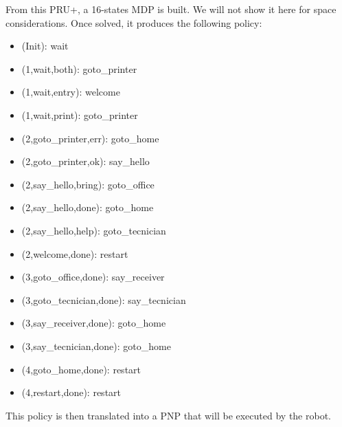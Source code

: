 From this PRU+, a 16-states MDP is built. We will not show it here for space considerations. Once solved, it produces the following policy:
\begin{multicols}{2}
  \begin{small}
    \begin{itemize}
    \item (Init): wait
    \item (1,wait,both): goto\_printer
    \item (1,wait,entry): welcome
    \item (1,wait,print): goto\_printer
    \item (2,goto\_printer,err): goto\_home
    \item (2,goto\_printer,ok): say\_hello
    \item (2,say\_hello,bring): goto\_office
    \item (2,say\_hello,done): goto\_home
    \item (2,say\_hello,help): goto\_tecnician
    \item (2,welcome,done): restart
    \item (3,goto\_office,done): say\_receiver
    \item (3,goto\_tecnician,done): say\_tecnician
    \item (3,say\_receiver,done): goto\_home
    \item (3,say\_tecnician,done): goto\_home
    \item (4,goto\_home,done): restart
    \item (4,restart,done): restart
    \end{itemize}
  \end{small}
\end{multicols}

This policy is then translated into a PNP that will be executed by the robot.
